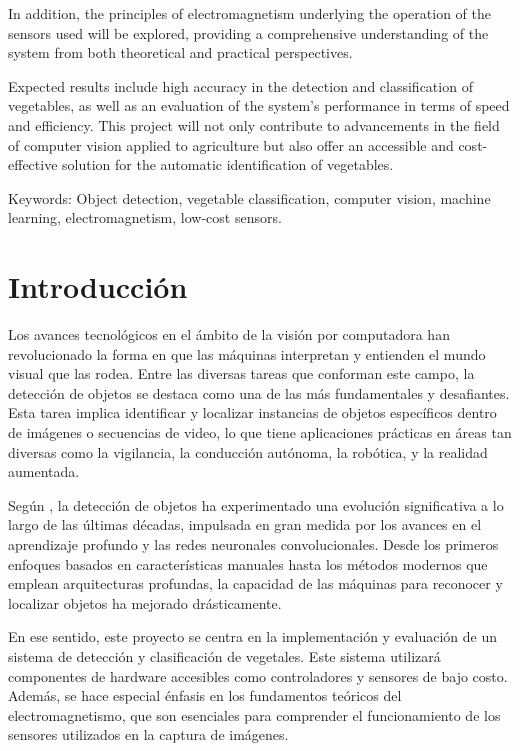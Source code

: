   In addition, the principles of electromagnetism underlying the operation of the sensors used will be explored, providing a comprehensive understanding of the system from both theoretical and practical perspectives.

  Expected results include high accuracy in the detection and classification of vegetables, as well as an evaluation of the system's performance in terms of speed and efficiency. This project will not only contribute to advancements in the field of computer vision applied to agriculture but also offer an accessible and cost-effective solution for the automatic identification of vegetables.

  Keywords: Object detection, vegetable classification, computer vision, machine learning, electromagnetism, low-cost sensors.

  \newpage

  \vspace*{\fill}

\section{Introducción}

  Los avances tecnológicos en el ámbito de la visión por computadora han revolucionado la forma en que las máquinas interpretan y entienden el mundo visual que las rodea. Entre las diversas tareas que conforman este campo, la detección de objetos se destaca como una de las más fundamentales y desafiantes. Esta tarea implica identificar y localizar instancias de objetos específicos dentro de imágenes o secuencias de video, lo que tiene aplicaciones prácticas en áreas tan diversas como la vigilancia, la conducción autónoma, la robótica, y la realidad aumentada. 

  Según \cite{Zou2019}, la detección de objetos ha experimentado una evolución significativa a lo largo de las últimas décadas, impulsada en gran medida por los avances en el aprendizaje profundo y las redes neuronales convolucionales. Desde los primeros enfoques basados en características manuales hasta los métodos modernos que emplean arquitecturas profundas, la capacidad de las máquinas para reconocer y localizar objetos ha mejorado drásticamente.

  En ese sentido, este proyecto se centra en la implementación y evaluación de un sistema de detección y clasificación de vegetales. Este sistema utilizará componentes de hardware accesibles como controladores y sensores de bajo costo. Además, se hace especial énfasis en los fundamentos teóricos del electromagnetismo, que son esenciales para comprender el funcionamiento de los sensores utilizados en la captura de imágenes.

\vspace*{\fill}


